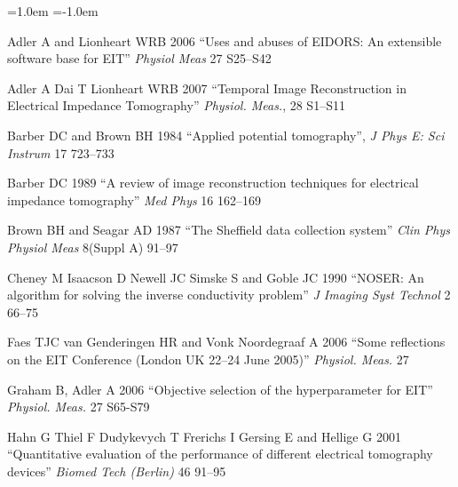 \documentclass[letterpaper,twocolumn,10pt]{article}
\begin{document}
\begin{list}{}
  {\leftmargin=1.0em \itemindent=-1.0em
    \baselineskip
    \baselineskip}
\item[]
Adler A and Lionheart WRB 2006
``Uses and abuses of EIDORS: An extensible software base for EIT''
{\em Physiol Meas}
27 S25--S42

\item[]
Adler A Dai T Lionheart WRB 2007
``Temporal Image Reconstruction in Electrical Impedance Tomography''
{\em Physiol. Meas.}, 28 S1--S11


\item[]
Barber DC and Brown BH 1984
``Applied potential tomography'', 
{\em J Phys E: Sci Instrum}
 17 723--733

\item[]
Barber DC 1989
``A review of image reconstruction techniques for electrical
 impedance tomography''
{\em Med Phys}
16 162--169

\item[]
Brown BH and Seagar AD 1987 
``The Sheffield data collection system''
{\em Clin Phys Physiol Meas}
 8(Suppl A) 91--97

\item[]
Cheney M Isaacson D Newell JC Simske S and Goble JC 1990
``NOSER: An algorithm for solving the inverse conductivity problem''
{\em J Imaging Syst Technol} 2 66--75

\item[]
Faes TJC van Genderingen HR and Vonk Noordegraaf A  2006
``Some reflections on the EIT Conference (London UK 22--24 June 2005)''
{\em Physiol. Meas.} 27


%

\item[]
Graham B, Adler A 2006
``Objective selection of the hyperparameter for EIT''
{\em Physiol. Meas.}
27 S65-S79

\item[]
Hahn G Thiel F Dudykevych T Frerichs I Gersing E
and Hellige G 2001
``Quantitative evaluation of the performance of
different electrical tomography devices''
{\em  Biomed Tech (Berlin)}
46 91--95


\end{list}
\end{document}
